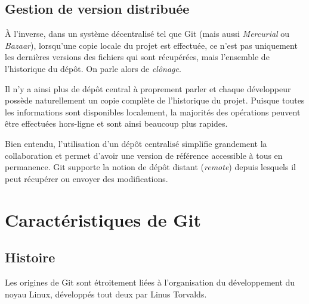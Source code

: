 \documentclass[11pt,a4paper]{article}
\begin{document}
\subsection{Gestion de version distribuée}

À l'inverse, dans un système décentralisé tel que Git (mais aussi \textit{Mercurial} ou \textit{Bazaar}), lorsqu'une copie locale du projet est effectuée, ce n'est pas uniquement les dernières versions des fichiers qui sont récupérées, mais l'ensemble de l'historique du dépôt.
On parle alors de \textit{clônage}.

Il n'y a ainsi plus de dépôt central à proprement parler et chaque développeur possède naturellement un copie complète de l'historique du projet. Puisque toutes les informations sont disponibles localement, la majorités des opérations peuvent être effectuées hors-ligne et sont ainsi beaucoup plus rapides.


Bien entendu, l'utilisation d'un dépôt centralisé simplifie grandement la collaboration et permet d'avoir une version de référence accessible à tous en permanence.
Git supporte la notion de dépôt distant (\textit{remote}) depuis lesquels il peut récupérer ou envoyer des modifications.


\section{Caractéristiques de Git}

\subsection{Histoire}

Les origines de Git sont étroitement liées à l'organisation du développement du noyau Linux, développés tout deux par Linus Torvalds.
\end{document}

